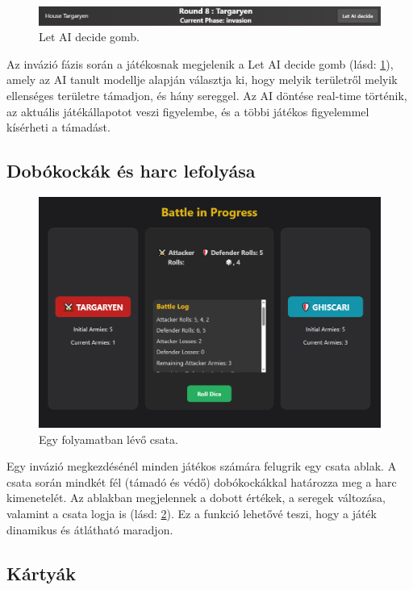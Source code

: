 \documentclass[
]{thesis-ekf}
\theoremstyle{definition}
\theoremstyle{remark}
\begin{document}
	\begin{figure}[ht!]
		\centering
		\includegraphics[width=16cm]{AIDont.png}
		\caption{Let AI decide gomb.}
		\label{AIDont}
	\end{figure}
	
	Az invázió fázis során a játékosnak megjelenik a Let AI decide gomb (lásd: \ref{AIDont}), amely az AI tanult modellje alapján választja ki, hogy melyik területről melyik ellenséges területre támadjon, és hány sereggel. Az AI döntése real-time történik, az aktuális játékállapotot veszi figyelembe, és a többi játékos figyelemmel kísérheti a támadást.
	
	\subsection*{Dobókockák és harc lefolyása}
	
	\begin{figure}[ht!]
		\centering
		\includegraphics[width=16cm]{battle.png}
		\caption{Egy folyamatban lévő csata.}
		\label{battle}
	\end{figure}
	
	Egy invázió megkezdésénél minden játékos számára felugrik egy csata ablak. A csata során mindkét fél (támadó és védő) dobókockákkal határozza meg a harc kimenetelét. Az ablakban megjelennek a dobott értékek, a seregek változása, valamint a csata logja is (lásd: \ref{battle}). Ez a funkció lehetővé teszi, hogy a játék dinamikus és átlátható maradjon.
	
	\subsection*{Kártyák}
	
\end{document}
